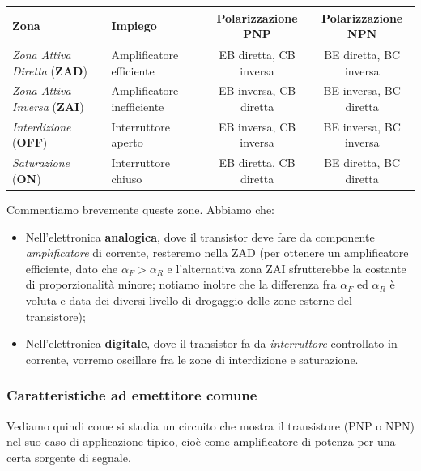 \documentclass[a4paper,11pt]{article}
\begin{document}
\begin{table}[H]
	\center {}
	\begin{tabular} { p{3.2cm} | p{2.5cm} || c | c }
		\bfseries Zona & \bfseries Impiego & \bfseries Polarizzazione PNP & \bfseries Polarizzazione NPN \\
		\hline 
		\textit{Zona Attiva Diretta} (\textbf{ZAD}) & Amplificatore efficiente & EB diretta, CB inversa & BE diretta, BC inversa \\
		\textit{Zona Attiva Inversa} (\textbf{ZAI}) & Amplificatore inefficiente & EB inversa, CB diretta & BE inversa, BC diretta \\
		\textit{Interdizione} (\textbf{OFF}) & Interruttore aperto & EB inversa, CB inversa & BE inversa, BC inversa \\
		\textit{Saturazione} (\textbf{ON}) & Interruttore chiuso & EB diretta, CB diretta & BE diretta, BC diretta \\
	\end{tabular}
\end{table}

Commentiamo brevemente queste zone. Abbiamo che:
\begin{itemize}
	\item Nell'elettronica \textbf{analogica}, dove il transistor deve fare da componente \textit{amplificatore} di corrente, resteremo nella ZAD (per ottenere un amplificatore efficiente, dato che $\alpha_F > \alpha_R$ e l'alternativa zona ZAI sfrutterebbe la costante di proporzionalità minore; notiamo inoltre che la differenza fra $\alpha_F$ ed $\alpha_R$ è voluta e data dei diversi livello di drogaggio delle zone esterne del transistore);
	\item Nell'elettronica \textbf{digitale}, dove il transistor fa da \textit{interruttore} controllato in corrente, vorremo oscillare fra le zone di interdizione e saturazione.
\end{itemize}

\subsubsection{Caratteristiche ad emettitore comune}

Vediamo quindi come si studia un circuito che mostra il transistore (PNP o NPN) nel suo caso di applicazione tipico, cioè come amplificatore di potenza per una certa sorgente di segnale.
\end{document}
